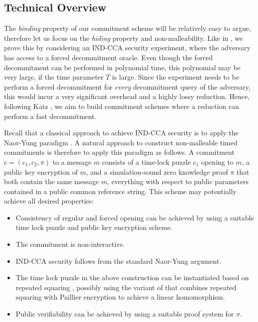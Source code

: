 
\subsection{Technical Overview}\label{sec:techoverview}
The \emph{binding} property of our commitment scheme will be relatively easy to argue, therefore let us focus on the \emph{hiding} property and non-malleability. Like in \cite{TCC:KatLosXu20}, we prove this by considering an IND-CCA security experiment, where the adversary has access to a forced decommitment oracle. 
Even though the forced decommitment can be performed in polynomial time, this polynomial may be very large, if the time parameter $T$ is large. Since the experiment needs to be perform a forced decommitment for \emph{every} decommitment query of the adversary, this would incur a very significant overhead and a highly lossy reduction.
Hence, following Katz \etal \cite{TCC:KatLosXu20}, we aim to build commitment schemes where a reduction can perform a fast decommitment. 

Recall that a classical approach to achieve IND-CCA security is to apply the Naor-Yung paradigm \cite{STOC:NaoYun90}. A natural approach to construct non-malleable timed commitments is therefore to apply this paradigm as follows. A commitment $c = (c_1, c_2, \pi)$ to a message $m$ consists of a time-lock puzzle $c_1$ opening to $m$, a public key encryption of $m$, and a simulation-sound zero knowledge proof $\pi$ that both contain the same message $m$, everything with respect to public parameters contained in a public common reference string.
This scheme may potentially achieve all desired properties:
\begin{itemize}
	\item Consistency of regular and forced opening can be achieved by using a suitable time lock puzzle and public key encryption scheme. 
	\item The commitment is non-interactive.
	\item IND-CCA security follows from the standard Naor-Yung argument.
	\item The time lock puzzle in the above construction can be instantiated based on repeated squaring \cite{RSW96}, possibly using the variant of \cite{C:MalThy19} that combines repeated squaring with Paillier encryption \cite{EC:Paillier99} to achieve a linear homomorphism. 
	\item Public verifiability can be achieved by using a suitable proof system for $\pi$.
\end{itemize}

